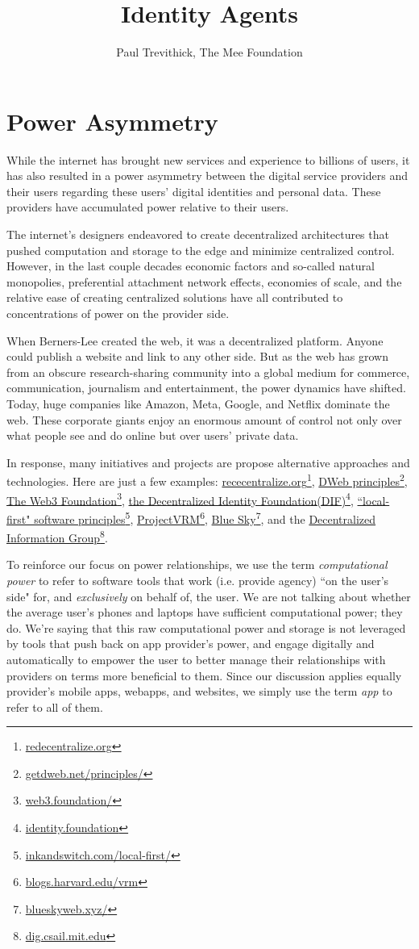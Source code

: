 \documentclass[11pt, oneside]{article}   	%
\title{Identity Agents}
\author{Paul Trevithick, The Mee Foundation}
\newcommand{\hyperfootnote}[1][]{\def\ArgI{{#1}}\hyperfootnoteRelay}
\newcommand\hyperfootnoteRelay[2][]{\href{#1#2}{\ArgI}\footnote{\href{#1#2}{#2}}}
\begin{document}
\maketitle

\section{Power Asymmetry}
While the internet has brought new services and experience to billions of users, it has also resulted in a power asymmetry between the digital service providers and their users regarding these users' digital identities and personal data. These providers have accumulated power relative to their users.

The internet's designers endeavored to create decentralized architectures that pushed computation and storage to the edge and minimize centralized control. However, in the last couple decades economic factors and so-called natural monopolies, preferential attachment network effects, economies of scale, and the relative ease of creating centralized solutions have all contributed to concentrations of power on the provider side. 

When Berners-Lee created the web, it was a decentralized platform. Anyone could publish a website and link to any other side. But as the web has grown from an obscure research-sharing community into a global medium for commerce, communication, journalism and entertainment, the power dynamics have shifted. Today, huge companies like Amazon, Meta, Google, and Netflix dominate the web. These corporate giants enjoy an enormous amount of control not only over what people see and do online but over users' private data.\cite{Finley2017}

In response, many initiatives and projects are propose alternative approaches and technologies. Here are just a few examples: \hyperfootnote[rececentralize.org][https://]{redecentralize.org}, \hyperfootnote[DWeb principles][https://]{getdweb.net/principles/}, \hyperfootnote[The Web3 Foundation][https://]{web3.foundation/}, \hyperfootnote[the Decentralized Identity Foundation(DIF)][https://]{identity.foundation}, \hyperfootnote[``local-first" software principles][https://]{inkandswitch.com/local-first/}, \hyperfootnote[ProjectVRM][https://]{blogs.harvard.edu/vrm}, \hyperfootnote[Blue Sky][https://]{blueskyweb.xyz/}, and the \hyperfootnote[Decentralized Information Group][https://]{dig.csail.mit.edu}. 

To reinforce our focus on power relationships, we use the term \emph{computational power} to refer to software tools that work (i.e. provide agency) ``on the user's side" for, and \emph{exclusively} on behalf of, the user. We are not talking about whether the average user's phones and laptops have sufficient computational power; they do. We're saying that this raw computational power and storage is not leveraged by tools that push back on app provider's power, and engage digitally and automatically to empower the user to better manage their relationships with providers on terms more beneficial to them. Since our discussion applies equally provider's mobile apps, webapps, and websites, we simply use the term \emph{app} to refer to all of them.
\end{document}
